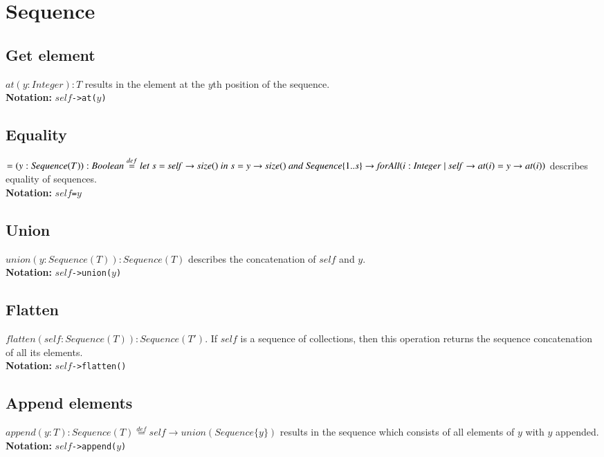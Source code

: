 \section{Sequence}
\subsection{Get element}
$\mathit{at}(y:\mathit{Integer}):T$ results in the element at the $y$th
  position of the sequence.\\
  {\bf Notation:} $\mathit{self}$\verb+->at(+$y$\verb+)+
\subsection{Equality}
$=(y:\mathit{Sequence}(T)):\mathit{Boolean}\stackrel{def}{=}\mathit{let}\
  s={\mathit{self}\rightarrow\mathit{size}()}\ \mathit{in}\
  s={y\rightarrow\mathit{size}()}\ \linebreak[1]\mathit{and}\ \linebreak[2]
  \mathit{Sequence}\{1..s\}\rightarrow
  \mathit{forAll}(i:\mathit{Integer}\mid \mathit{self}\rightarrow\mathit{at}(i)=y\rightarrow\mathit{at}(i))$
  describes equality of sequences.\\
  {\bf Notation:} $\mathit{self}$\verb+=+$y$
\subsection{Union}
$\mathit{union}(y:\mathit{Sequence}(T)):\mathit{Sequence}(T)$ describes the
  concatenation of $\mathit{self}$ and $y$.\\
  {\bf Notation:} $\mathit{self}$\verb+->union(+$y$\verb+)+
\subsection{Flatten}
$\mathit{flatten}(\mathit{self}:\mathit{Sequence}(T)):\mathit{Sequence}(T')$.  If $\mathit{self}$ is a sequence of
  collections, then this operation returns the sequence concatenation
  of all its elements.\\
  {\bf Notation:} $\mathit{self}$\verb+->flatten()+
\subsection{Append elements}
$\mathit{append}(y:T):\mathit{Sequence}(T)\stackrel{def}{=}
\mathit{self}\rightarrow\mathit{union}(\mathit{Sequence}\{y\})$ results in the sequence
  which consists of all elements of $y$ with $y$ appended.\\
  {\bf Notation:} $\mathit{self}$\verb+->append(+$y$\verb+)+
